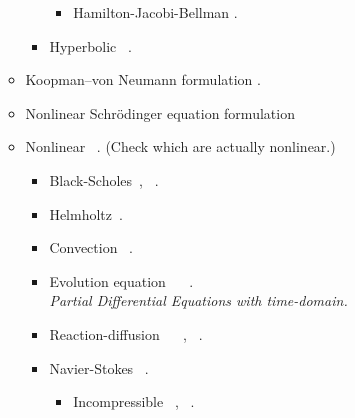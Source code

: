 \documentclass[12pt,letterpaper]{article}
\newcommand{\red}[1]{{\color{red}(#1)}}
\begin{document}
\begin{itemize}
\begin{itemize}
\begin{itemize}
\begin{itemize}
                        \item Hamilton-Jacobi-Bellman  \cite{patelQuantumInspiredTensorNeural2022}.
                    \end{itemize}
                    
                    \item Hyperbolic  ~\cite{jinTimeComplexityAnalysis2022a,jinQuantumAlgorithmsComputing2022}.

				\end{itemize}

            \item Koopman–von Neumann formulation   \cite{IlonJoseph2020,jinTimeComplexityAnalysis2022}.
            
            \item Nonlinear Schrödinger equation formulation   \cite{lloyd2020quantum}

            \item Nonlinear  ~\cite{jinQuantumAlgorithmsComputing2022}. \red{Check which are actually nonlinear.}
            \begin{itemize}
    			\item Black-Scholes~\cite{fontanela_short_2021,miyamoto_pricing_2022},  ~\cite{jinQuantumSimulationPartial2022a}.
       
    			\item Helmholtz~\cite{ewe_variational_2022}.
    
                \item Convection  ~\cite{jinQuantumSimulationPartial2022a}.
       
    			\item Evolution equation ~ ~\cite{leongVariationalQuantumEvolution2022a}.\\
                \textit{Partial Differential Equations with time-domain.}
       
    			\item Reaction-diffusion ~ ~\cite{leongVariationalQuantumEvolution2022a,demirdjianVariationalQuantumSolutions2022},  ~\cite{anEfficientQuantumAlgorithm2022}.
    
                \item Navier-Stokes  ~\cite{gaitanFindingFlowsNavier2020}.
                \begin{itemize}
                    \item Incompressible ~\cite{leongVariationalQuantumEvolution2022a},  ~\cite{lapworthHybridQuantumClassicalCFD2022}.
                \end{itemize}
    

\end{itemize}
\end{itemize}
\end{itemize}
\end{document}
